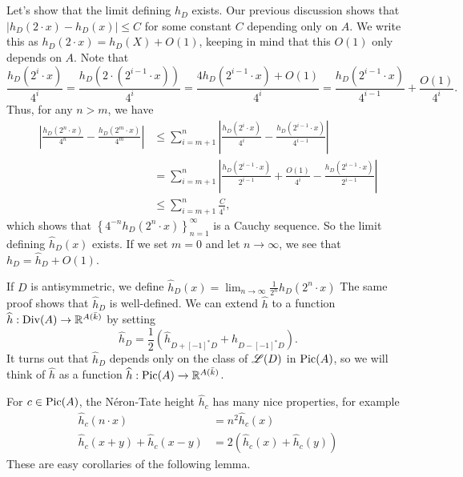 \documentclass{article}
\begin{document}
Let's show that the limit defining $\widehat h_D$ exists. Our previous 
discussion shows that $|h_D(2\cdot x)-h_D(x)|\leqslant C$ for some constant $C$ 
depending only on $A$. We write this as $h_D(2\cdot x)=h_D(X)+O(1)$, keeping in 
mind that this $O(1)$ only depends on $A$. Note that 
\[
  \frac{h_D(2^i\cdot x)}{4^i} = \frac{h_D(2\cdot (2^{i-1}\cdot x))}{4^i} = \frac{4 h_D(2^{i-1}\cdot x)+O(1)}{4^i} = \frac{h_D(2^{i-1}\cdot x)}{4^{i-1}} + \frac{O(1)}{4^i} \text{.}
\]
Thus, for any $n>m$, we have 
\begin{align*}
  \left| \frac{h_D(2^n \cdot x)}{4^n} - \frac{h_D(2^m\cdot x)}{4^m}\right|
    &\leqslant \sum_{i=m+1}^n \left|\frac{h_D(2^i\cdot x)}{4^i} - \frac{h_D(2^{i-1}\cdot x)}{4^{i-1}}\right| \\
    &= \sum_{i=m+1}^n \left|\frac{h_D(2^{i-1}\cdot x)}{2^{i-1}} +\frac{O(1)}{4^i} - \frac{h_D(2^{i-1}\cdot x)}{2^{i-1}}\right| \\
    &\leqslant \sum_{i=m+1}^n \frac{C}{4^i} \text{,}
\end{align*}
which shows that $\left\{4^{-n} h_D(2^n\cdot x)\right\}_{n=1}^\infty$ is a Cauchy 
sequence. So the limit defining $\widehat h_D(x)$ exists. If we set $m=0$ and 
let $n\to \infty$, we see that $h_D=\widehat h_D+O(1)$. 

If $D$ is antisymmetric, we define 
$\widehat h_D(x)=\lim_{n\to\infty} \frac{1}{2^n} h_D(2^n\cdot x)$
The same proof shows that $\widehat h_D$ is well-defined. We can extend 
$\widehat h$ to a function $\widehat h:\operatorname{Div}(A)\to \mathbb{R}^{A(\bar k)}$ by setting 
\[
  \widehat h_D=\frac 1 2 \left(\widehat h_{D+[-1]^\ast D} +  h_{D-[-1]^\ast D}\right) \text{.}
\]
It turns out that $\widehat h_D$ depends only on the class of $\mathscr{L}(D)$ in 
$\operatorname{Pic}(A)$, so we will think of $\widehat h$ as a function 
$\widehat h:\operatorname{Pic}(A) \to \mathbb{R}^{A(\bar k)}$. 

For $c\in \operatorname{Pic}(A)$, the N\'eron-Tate height $\widehat h_c$ has many nice 
properties, for example 
\begin{align*}
  \widehat h_c(n\cdot x) &= n^2 \widehat h_c(x) \\
  \widehat h_c(x+y)+\widehat h_c(x-y) &= 2\left(\widehat h_c(x)+\widehat h_c(y)\right)
\end{align*}
These are easy corollaries of the following lemma.
\end{document}
